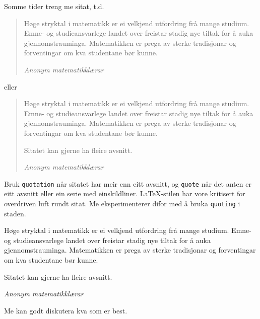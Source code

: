 \documentclass[nynorsk]{mnt}
\begin{document}
Somme tider treng me sitat, t.d.\
\begin{quote}
Høge stryktal i matematikk er ei velkjend utfordring frå mange studium.
Emne- og studieansvarlege landet over freistar 
stadig nye tiltak for å auka gjennomstrauminga.
Matematikken er prega av sterke tradisjonar og forventingar om kva
studentane bør kunne.

\raggedleft\emph{Anonym matematikklærar}
\end{quote}
eller 
\begin{quotation}
Høge stryktal i matematikk er ei velkjend utfordring frå mange studium.
Emne- og studieansvarlege landet over freistar 
stadig nye tiltak for å auka gjennomstrauminga.
Matematikken er prega av sterke tradisjonar og forventingar om kva
studentane bør kunne.

Sitatet kan gjerne ha fleire avsnitt.

\raggedleft\emph{Anonym matematikklærar}
\end{quotation}
Bruk \verb.quotation. når sitatet har meir enn eitt avsnitt, og 
\verb.quote. når det anten er eitt avsnitt eller ein serie med 
einskildliner.
\LaTeX-stilen har vore kritisert for overdriven luft rundt sitat.
Me eksperimenterer difor med å bruka \verb.quoting. i staden.
\begin{quoting}
Høge stryktal i matematikk er ei velkjend utfordring frå mange studium.
Emne- og studieansvarlege landet over freistar 
stadig nye tiltak for å auka gjennomstrauminga.
Matematikken er prega av sterke tradisjonar og forventingar om kva
studentane bør kunne.

Sitatet kan gjerne ha fleire avsnitt.

\raggedleft\emph{Anonym matematikklærar}
\end{quoting}
Me kan godt diskutera kva som er best.



\end{document}
